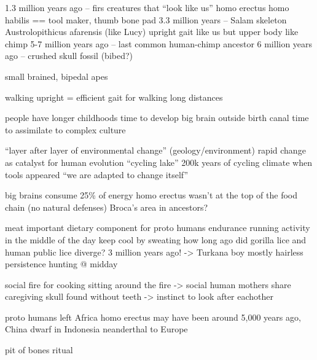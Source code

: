 1.3 million years ago -- firs creatures that ``look like us''
  homo erectus
  homo habilis == tool maker, thumb bone pad
3.3 million years -- Salam skeleton Austrolopithicus afarensis (like Lucy)
  upright gait like us
  but upper body like chimp
5-7 million years ago -- last common human-chimp ancestor
6 million years ago -- crushed skull fossil (bibed?)

small brained, bipedal apes

walking upright = efficient gait for walking long distances

people have longer childhoods
  time to develop big brain outside birth canal
  time to assimilate to complex culture

``layer after layer of environmental change'' (geology/environment)
  rapid change as catalyst for human evolution
  ``cycling lake''
  200k years of cycling climate when tools appeared
  ``we are adapted to change itself''

big brains consume 25\% of energy
  homo erectus wasn't at the top of the food chain (no natural defenses)
  Broca's area in ancestors?

meat important dietary component for proto humans
  endurance running
  activity in the middle of the day
  keep cool by sweating
  how long ago did gorilla lice and human public lice diverge?
  3 million years ago! -> Turkana boy mostly hairless
  persistence hunting @ midday

social
  fire for cooking
  sitting around the fire -> social
  human mothers share caregiving
  skull found without teeth -> instinct to look after eachother
  
proto humans left Africa
  homo erectus may have been around 5,000 years ago, China
  dwarf in Indonesia
  neanderthal to Europe
  
pit of bones ritual
